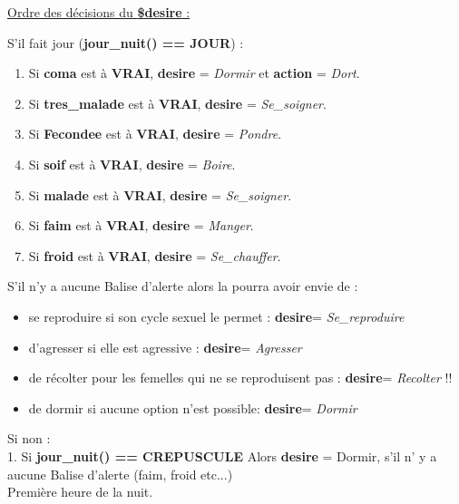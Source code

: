 \documentclass[french]{report}
\begin{document}
\begin{center}
	\underline{Ordre des décisions du \textbf{\$desire} : }
\end{center}
S'il fait jour (\textbf{jour\_nuit() == JOUR}) :\\
\begin{enumerate}
	\item Si \textbf{coma} est à \textbf{VRAI}, \textbf{desire} = \textit{Dormir} et \textbf{action} = \textit{Dort}.
	\item Si \textbf{tres\_malade} est à \textbf{VRAI}, \textbf{desire} = \textit{Se\_soigner}.
	\item Si \textbf{Fecondee} est à \textbf{VRAI}, \textbf{desire} = \textit{Pondre}.
	\item Si \textbf{soif} est à \textbf{VRAI}, \textbf{desire} = \textit{Boire}.
	\item Si \textbf{malade} est à \textbf{VRAI}, \textbf{desire} = \textit{Se\_soigner}.
	\item Si \textbf{faim} est à \textbf{VRAI}, \textbf{desire} = \textit{Manger}.
	\item Si \textbf{froid} est à \textbf{VRAI}, \textbf{desire} = \textit{Se\_chauffer}.
\end{enumerate}

S'il n'y a aucune Balise d'alerte alors la \CoCiX pourra avoir envie de : \\
\begin{itemize}
	\item se reproduire si son cycle sexuel le permet : 
	\textbf{desire}= \textit{Se\_reproduire} \\
	\item d'agresser si elle est agressive : 
	\textbf{desire}= \textit{Agresser} \\
	\item de récolter pour les femelles qui ne se reproduisent pas : 
	\textbf{desire}= \textit{Recolter} !!\\
	\item de dormir si aucune option n'est possible:
	\textbf{desire}= \textit{Dormir} \\
\end{itemize}
Si non :\\

1. Si \textbf{jour\_nuit() == CREPUSCULE}  Alors \textbf{desire}  = Dormir, s'il n' y a aucune Balise d'alerte (faim, froid etc...)\\
Première heure de la nuit.\\
\end{document}
